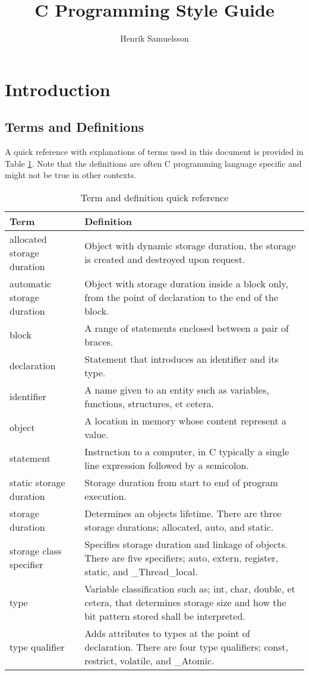 \documentclass{report}
\title{C Programming Style Guide}
\author{Henrik Samuelsson}
\begin{document}
\maketitle

\section{Introduction}

\subsection{Terms and Definitions}

A quick reference with explanations of terms used in this document is provided in Table \ref{tab:terms-and-defs}. Note that the definitions are often C programming language specific and might not be true in other contexts.

\begin{table}[h]
\begin{tabularx}{\textwidth}{lX}
\toprule
Term & Definition \\
\midrule
allocated storage duration & Object with dynamic storage duration, the storage is created and destroyed upon request. \\
automatic	storage duration &	Object with storage duration inside a block only, from the point of declaration to the end of the block. \\
block & A range of statements enclosed between a pair of braces. \\
declaration & Statement that introduces an identifier and its type. \\
identifier & A name given to an entity such as variables, functions, structures, et cetera. \\
object & A location in memory whose content represent a value. \\
statement & Instruction to a computer, in C typically a single line expression followed by a semicolon. \\
static storage duration & Storage duration from start to end of program execution. \\
storage duration & Determines an objects lifetime. There are three storage durations; allocated, auto, and static. \\
storage class specifier & Specifies storage duration and linkage of objects. There are five specifiers; auto, extern, register, static, and \_Thread\_local. \\
type & Variable classification such as; int, char, double, et cetera, that determines storage size and how the bit pattern stored shall be interpreted.\\
type qualifier & Adds attributes to types at the point of declaration. There are four type qualifiers; const, restrict, volatile, and \_Atomic. \\
\bottomrule
\end{tabularx}
\caption{Term and definition quick reference}
\label{tab:terms-and-defs}
\end{table}
\end{document}
